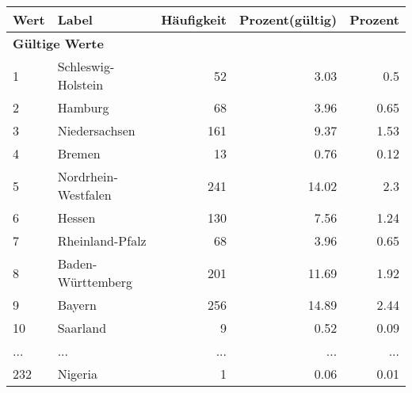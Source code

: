      \begin{longtable}{lXrrr}
     \toprule
     \textbf{Wert} & \textbf{Label} & \textbf{Häufigkeit} & \textbf{Prozent(gültig)} & \textbf{Prozent} \\
     \endhead
     \midrule
     \multicolumn{5}{l}{\textbf{Gültige Werte}}\\
        1 & \multicolumn{1}{X}{Schleswig-Holstein} & %
          \num{52} &
          \num[round-mode=places,round-precision=2]{3.03} &
          \num[round-mode=places,round-precision=2]{0.5} \\
        2 & \multicolumn{1}{X}{Hamburg} & %
          \num{68} &
          \num[round-mode=places,round-precision=2]{3.96} &
          \num[round-mode=places,round-precision=2]{0.65} \\
        3 & \multicolumn{1}{X}{Niedersachsen} & %
          \num{161} &
          \num[round-mode=places,round-precision=2]{9.37} &
          \num[round-mode=places,round-precision=2]{1.53} \\
        4 & \multicolumn{1}{X}{Bremen} & %
          \num{13} &
          \num[round-mode=places,round-precision=2]{0.76} &
          \num[round-mode=places,round-precision=2]{0.12} \\
        5 & \multicolumn{1}{X}{Nordrhein-Westfalen} & %
          \num{241} &
          \num[round-mode=places,round-precision=2]{14.02} &
          \num[round-mode=places,round-precision=2]{2.3} \\
        6 & \multicolumn{1}{X}{Hessen} & %
          \num{130} &
          \num[round-mode=places,round-precision=2]{7.56} &
          \num[round-mode=places,round-precision=2]{1.24} \\
        7 & \multicolumn{1}{X}{Rheinland-Pfalz} & %
          \num{68} &
          \num[round-mode=places,round-precision=2]{3.96} &
          \num[round-mode=places,round-precision=2]{0.65} \\
        8 & \multicolumn{1}{X}{Baden-Württemberg} & %
          \num{201} &
          \num[round-mode=places,round-precision=2]{11.69} &
          \num[round-mode=places,round-precision=2]{1.92} \\
        9 & \multicolumn{1}{X}{Bayern} & %
          \num{256} &
          \num[round-mode=places,round-precision=2]{14.89} &
          \num[round-mode=places,round-precision=2]{2.44} \\
        10 & \multicolumn{1}{X}{Saarland} & %
          \num{9} &
          \num[round-mode=places,round-precision=2]{0.52} &
          \num[round-mode=places,round-precision=2]{0.09} \\
       ... & ... & ... & ... & ... \\
        232 & \multicolumn{1}{X}{Nigeria} & %
          \num{1} &
          \num[round-mode=places,round-precision=2]{0.06} &
          \num[round-mode=places,round-precision=2]{0.01} \\


\end{longtable}
